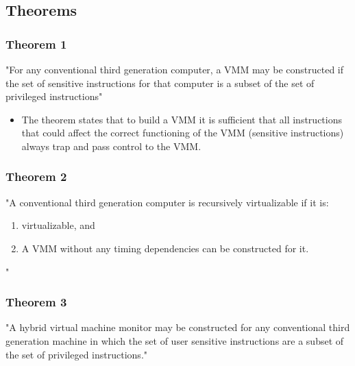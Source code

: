 \documentclass{article}
\begin{document}
\subsection{Theorems}
\subsubsection{Theorem 1}
"For any conventional third generation computer, a VMM may
be constructed if the set of sensitive instructions for that computer is a
subset of the set of privileged instructions"

\begin{itemize}
    \item The theorem states that to build a VMM it is sufficient that all instructions that could affect the correct functioning of the VMM (sensitive instructions) always trap and pass control to the VMM.
\end{itemize}

\subsubsection{Theorem 2}
"A conventional third generation computer is recursively virtualizable if it is:
\begin{enumerate}
    \item virtualizable, and
    
    \item A VMM without any timing dependencies can be constructed for it.
\end{enumerate}"

\subsubsection{Theorem 3}
"A hybrid virtual machine monitor may be constructed for any conventional third generation machine in which the set of user sensitive instructions are a subset of the set of privileged instructions."
\end{document}
